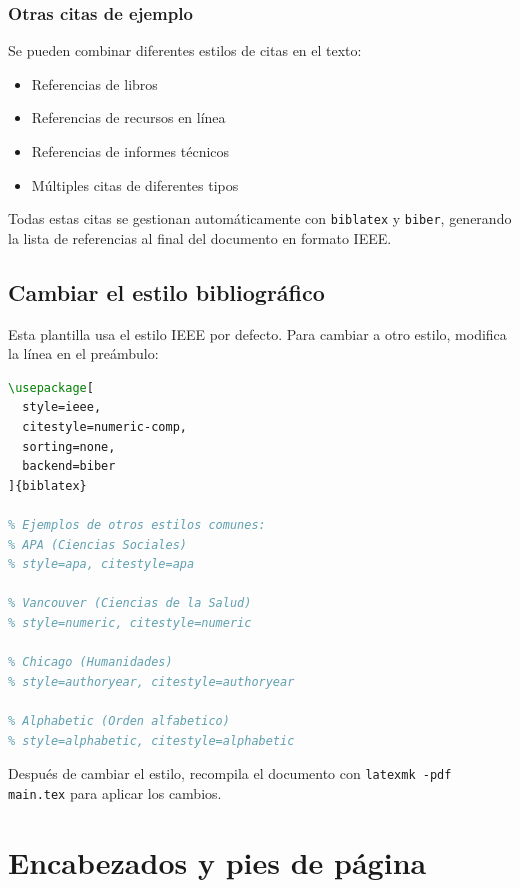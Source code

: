 \documentclass[a4paper,11pt]{report}
\begin{document}
\begin{appendices}
\subsubsection{Otras citas de ejemplo}

Se pueden combinar diferentes estilos de citas en el texto:

\begin{itemize}
  \item Referencias de libros~\cite{Apellido1997}
  \item Referencias de recursos en línea~\cite{Organizacion2023}
  \item Referencias de informes técnicos~\cite{Organismo2001}
  \item Múltiples citas de diferentes tipos~\cites{Apellido1997,Organizacion2023,Organismo2001}
\end{itemize}

Todas estas citas se gestionan automáticamente con \texttt{biblatex} y \texttt{biber}, generando la lista de referencias al final del documento en formato IEEE.

\subsection{Cambiar el estilo bibliográfico}

Esta plantilla usa el estilo IEEE por defecto. Para cambiar a otro estilo, modifica la línea en el preámbulo:

\begin{lstlisting}[language=TeX, caption={Configuración del estilo bibliográfico}]
% Estilo actual (IEEE)
\usepackage[
  style=ieee,
  citestyle=numeric-comp,
  sorting=none,
  backend=biber
]{biblatex}

% Ejemplos de otros estilos comunes:
% APA (Ciencias Sociales)
% style=apa, citestyle=apa

% Vancouver (Ciencias de la Salud)
% style=numeric, citestyle=numeric

% Chicago (Humanidades)
% style=authoryear, citestyle=authoryear

% Alphabetic (Orden alfabetico)
% style=alphabetic, citestyle=alphabetic
\end{lstlisting}

Después de cambiar el estilo, recompila el documento con \texttt{latexmk -pdf main.tex} para aplicar los cambios.

\section{Encabezados y pies de página}


\end{appendices}
\end{document}
